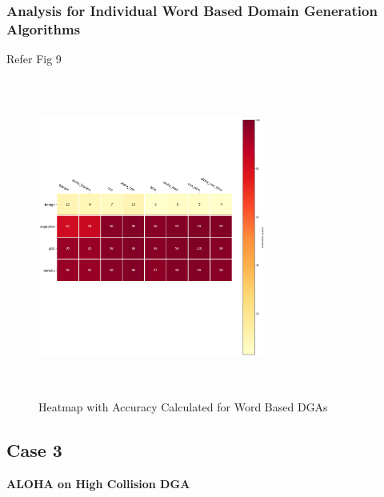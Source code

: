 \documentclass[conference]{IEEEtran}
\begin{document}
\subsubsection{Analysis for Individual Word Based Domain Generation Algorithms}
Refer Fig 9 \\
\begin{figure}[!h]
\centerline{\includegraphics[width=7.5cm,height=10.5cm,keepaspectratio]{heatmap_word.png}}
\caption{Heatmap with Accuracy Calculated for Word Based DGAs  }
\label{fig}
\end{figure}


\subsection{Case 3}
\textbf{ALOHA on High Collision DGA}
\end{document}
